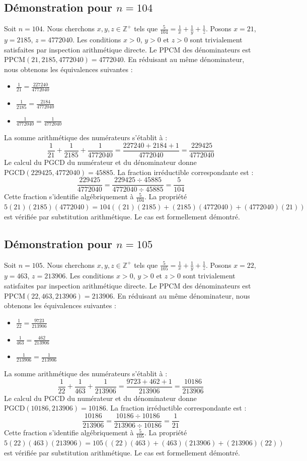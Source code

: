 \documentclass[12pt,a4paper]{article}
\begin{document}
\subsection{Démonstration pour $n = 104$}
Soit $n = 104$. Nous cherchons $x, y, z \in \mathbb{Z}^{+}$ tels que $\frac{5}{104} = \frac{1}{x} + \frac{1}{y} + \frac{1}{z}$.
Posons $x = 21$, $y = 2185$, $z = 4772040$.
Les conditions $x > 0$, $y > 0$ et $z > 0$ sont trivialement satisfaites par inspection arithmétique directe.
Le PPCM des dénominateurs est $\text{PPCM}(21, 2185, 4772040) = 4772040$.
En réduisant au même dénominateur, nous obtenons les équivalences suivantes :
\begin{itemize}
    \item $\frac{1}{21} = \frac{227240}{4772040}$
    \item $\frac{1}{2185} = \frac{2184}{4772040}$
    \item $\frac{1}{4772040} = \frac{1}{4772040}$
\end{itemize}
La somme arithmétique des numérateurs s'établit à :
$$ \frac{1}{21} + \frac{1}{2185} + \frac{1}{4772040} = \frac{227240 + 2184 + 1}{4772040} = \frac{229425}{4772040} $$
Le calcul du PGCD du numérateur et du dénominateur donne $\text{PGCD}(229425, 4772040) = 45885$.
La fraction irréductible correspondante est :
$$ \frac{229425}{4772040} = \frac{229425 \div 45885}{4772040 \div 45885} = \frac{5}{104} $$
Cette fraction s'identifie algébriquement à $\frac{5}{104}$.
La propriété $5(21)(2185)(4772040) = 104((21)(2185) + (2185)(4772040) + (4772040)(21))$ est vérifiée par substitution arithmétique.
Le cas est formellement démontré.

\subsection{Démonstration pour $n = 105$}
Soit $n = 105$. Nous cherchons $x, y, z \in \mathbb{Z}^{+}$ tels que $\frac{5}{105} = \frac{1}{x} + \frac{1}{y} + \frac{1}{z}$.
Posons $x = 22$, $y = 463$, $z = 213906$.
Les conditions $x > 0$, $y > 0$ et $z > 0$ sont trivialement satisfaites par inspection arithmétique directe.
Le PPCM des dénominateurs est $\text{PPCM}(22, 463, 213906) = 213906$.
En réduisant au même dénominateur, nous obtenons les équivalences suivantes :
\begin{itemize}
    \item $\frac{1}{22} = \frac{9723}{213906}$
    \item $\frac{1}{463} = \frac{462}{213906}$
    \item $\frac{1}{213906} = \frac{1}{213906}$
\end{itemize}
La somme arithmétique des numérateurs s'établit à :
$$ \frac{1}{22} + \frac{1}{463} + \frac{1}{213906} = \frac{9723 + 462 + 1}{213906} = \frac{10186}{213906} $$
Le calcul du PGCD du numérateur et du dénominateur donne $\text{PGCD}(10186, 213906) = 10186$.
La fraction irréductible correspondante est :
$$ \frac{10186}{213906} = \frac{10186 \div 10186}{213906 \div 10186} = \frac{1}{21} $$
Cette fraction s'identifie algébriquement à $\frac{5}{105}$.
La propriété $5(22)(463)(213906) = 105((22)(463) + (463)(213906) + (213906)(22))$ est vérifiée par substitution arithmétique.
Le cas est formellement démontré.
\end{document}
